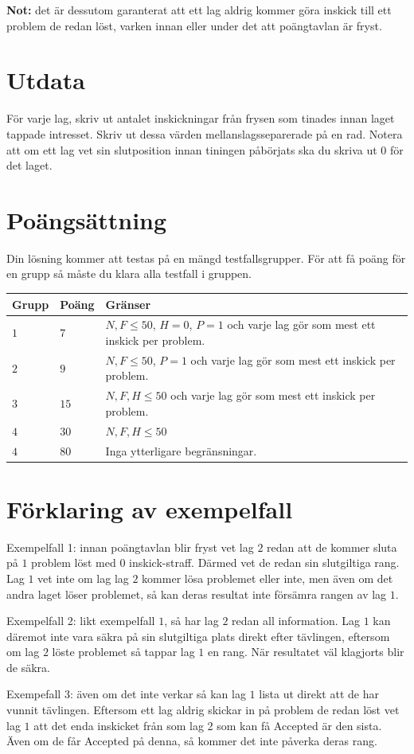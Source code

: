 \textbf{Not:} det är dessutom garanterat att ett lag aldrig kommer göra inskick till ett problem de redan löst,
varken innan eller under det att poängtavlan är fryst.

\section*{Utdata}
För varje lag, skriv ut antalet inskickningar från frysen som tinades innan laget tappade intresset.
Skriv ut dessa värden mellanslagsseparerade på en rad.
Notera att om ett lag vet sin slutposition innan tiningen påbörjats ska du skriva ut $0$ för det laget.

\section*{Poängsättning}
Din lösning kommer att testas på en mängd testfallsgrupper.
För att få poäng för en grupp så måste du klara alla testfall i gruppen.

\noindent
\begin{tabular}{| l | l | p{12cm} |}
  \hline
  \textbf{Grupp} & \textbf{Poäng} & \textbf{Gränser} \\ \hline
  $1$    & $7$        & $N,F \leq 50$, $H=0$, $P=1$ och varje lag gör som mest ett inskick per problem. \\ \hline
  $2$    & $9$        & $N,F \leq 50$, $P=1$ och varje lag gör som mest ett inskick per problem. \\ \hline
  $3$    & $15$       & $N,F,H \leq 50$ och varje lag gör som mest ett inskick per problem. \\ \hline
  $4$    & $30$       & $N,F,H \leq 50$ \\ \hline
  $4$    & $80$       & Inga ytterligare begränsningar. \\ \hline
\end{tabular}

\section*{Förklaring av exempelfall}
Exempelfall 1: innan poängtavlan blir fryst vet lag $2$ redan att de kommer sluta på $1$ problem löst med $0$ inskick-straff.
Därmed vet de redan sin slutgiltiga rang.
Lag $1$ vet inte om lag lag $2$ kommer lösa problemet eller inte, men även om det andra laget löser problemet,
så kan deras resultat inte försämra rangen av lag $1$.

Exempelfall 2: likt exempelfall $1$, så har lag $2$ redan all information.
Lag $1$ kan däremot inte vara säkra på sin slutgiltiga plats direkt efter tävlingen, eftersom om lag $2$ löste problemet så tappar lag $1$ en rang.
När resultatet väl klagjorts blir de säkra.

Exempefall 3: även om det inte verkar så kan lag $1$ lista ut direkt att de har vunnit tävlingen.
Eftersom ett lag aldrig skickar in på problem de redan löst vet lag $1$ att det enda inskicket från som lag 2 som kan få Accepted är den sista.
Även om de får Accepted på denna, så kommer det inte påverka deras rang.
